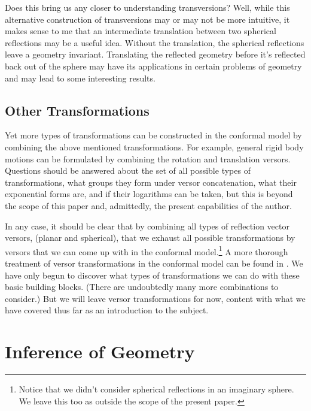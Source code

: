 \documentclass[12pt]{article}
\begin{document}
Does this bring us any closer to understanding transversions?  Well, while this alternative
construction of transversions may or may not be more intuitive, it makes sense to me
that an intermediate translation between two spherical reflections may be a useful idea.
Without the translation, the spherical reflections leave a geometry invariant.  Translating
the reflected geometry before it's reflected back out of the sphere may have its applications
in certain problems of geometry and may lead to some interesting results.

\subsection{Other Transformations}

Yet more types of transformations can be constructed in the conformal model
by combining the above mentioned transformations.  For example, general
rigid body motions can be formulated by combining the rotation and translation
versors.  Questions should be answered about the set of all possible types
of transformations, what groups they form under versor concatenation, what
their exponential forms are, and if their logarithms can be taken, but
this is beyond the scope of this paper and, admittedly, the present capabilities of the author.

In any case, it should be clear that by combining all types of reflection vector versors, (planar and spherical),
that we exhaust all possible transformations by versors that we can come up with in the
conformal model.\footnote{Notice that we didn't consider spherical reflections in an imaginary sphere.
We leave this too as outside the scope of the present paper.}
A more thorough treatment of versor transformations in the conformal model can be found in
\cite{dorst07}.
We have only begun to discover what types of transformations we
can do with these basic building blocks.  (There are undoubtedly many more combinations to
consider.)  But we will leave versor transformations for now, content with what we have
covered thus far as an introduction to the subject.

\section{Inference of Geometry}
\end{document}

